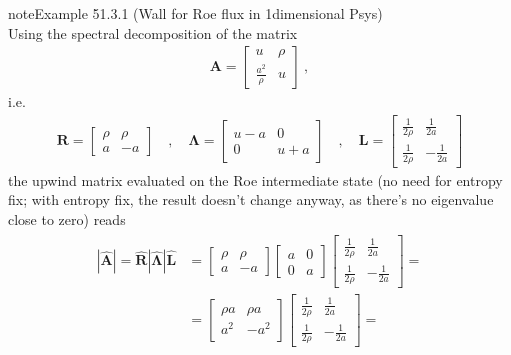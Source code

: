 \documentclass[letterpaper,10pt,english]{jupyterBook}
\begin{document}
\begin{sphinxadmonition}{note}{Example 51.3.1 (Wall for Roe flux in 1\sphinxhyphen{}dimensional P\sphinxhyphen{}sys)}
\begin{equation*}
\end{equation*}
\sphinxAtStartPar
{} Using the spectral decomposition of the matrix
\begin{equation*}
\begin{split}\mathbf{A} = \begin{bmatrix} u & \rho \\ \frac{a^2}{\rho} & u  \end{bmatrix} \ ,\end{split}
\end{equation*}
\sphinxAtStartPar
i.e.
\begin{equation*}
\begin{split}
\mathbf{R} = \begin{bmatrix} \rho & \rho \\ a & -a \end{bmatrix} \quad , \quad
\boldsymbol\Lambda = \begin{bmatrix} u-a & 0 \\ 0 & u+a \end{bmatrix} \quad , \quad
\mathbf{L} = \begin{bmatrix} \frac{1}{2\rho} & \frac{1}{2a} \\ \frac{1}{2\rho} & -\frac{1}{2a} \end{bmatrix}
\end{split}
\end{equation*}
\sphinxAtStartPar
the upwind matrix evaluated on the Roe intermediate state (no need for entropy fix; with entropy fix, the result doesn’t change anyway, as there’s no eigenvalue close to zero) reads
\begin{equation*}
\begin{split}\begin{aligned}
|\hat{\mathbf{A}}|
= \hat{\mathbf{R}} \left| \hat{\boldsymbol{\Lambda}} \right| \hat{\mathbf{L}} 
& = \begin{bmatrix} \rho & \rho \\ a & -a \end{bmatrix} \begin{bmatrix} a & 0 \\ 0 & a \end{bmatrix} \begin{bmatrix} \frac{1}{2\rho} & \frac{1}{2a} \\ \frac{1}{2\rho} & -\frac{1}{2a} \end{bmatrix} = \\
& = \begin{bmatrix} \rho a & \rho a \\ a^2 & -a^2 \end{bmatrix} \begin{bmatrix} \frac{1}{2\rho} & \frac{1}{2a} \\ \frac{1}{2\rho} & -\frac{1}{2a} \end{bmatrix} = \\

\end{aligned}
\end{split}
\end{equation*}
\end{sphinxadmonition}
\end{document}
